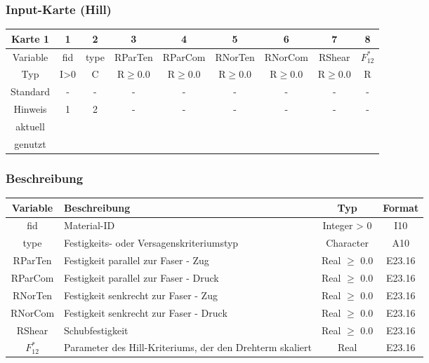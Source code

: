 \documentclass[11pt,titlepage,listof=totoc,bibliography=totoc,twoside]{scrreprt}
\begin{document}
{{\newpage

\subsubsection{Input-Karte (Hill)}

\begin{table}[htbp]
\centering
\begin{tabularx}{\textwidth}{cCCCCCCCC}
\toprule
Karte 1	& 1		& 2		& 3		& 4		& 5		& 6		& 7		& 8		\\
\midrule
Variable& fid		& type		& RParTen	& RParCom	& RNorTen	& RNorCom	& RShear	& $F_{12}^*$	\\
Typ	& I>0		& C		& R$\ge$0.0	& R$\ge$0.0	& R$\ge$0.0	& R$\ge$0.0	& R$\ge$0.0	& R		\\
Standard& -		& -		& -		& -		& -		& -		& -		& -		\\
Hinweis	& 1		& 2		& -		& -		& -		& -		& -		& -		\\
aktuell	& 	& 	& 	& 	& 	& 	& 	& 	\\
genutzt \\
\bottomrule
\end{tabularx}
\end{table}

\subsubsection{Beschreibung}

\begin{tabularx}{\textwidth}{cXcc}
\toprule
Variable& Beschreibung														& Typ			& Format\\
\midrule
fid	& Material-ID														& Integer > 0		& I10	\\
type	& Festigkeits- oder Versagenskriteriumstyp										& Character		& A10	\\
RParTen	& Festigkeit parallel zur Faser - Zug											& Real $\ge$ 0.0	& E23.16\\
RParCom	& Festigkeit parallel zur Faser - Druck											& Real $\ge$ 0.0	& E23.16\\
RNorTen	& Festigkeit senkrecht zur Faser - Zug											& Real $\ge$ 0.0	& E23.16\\
RNorCom	& Festigkeit senkrecht zur Faser - Druck										& Real $\ge$ 0.0	& E23.16\\
RShear	& Schubfestigkeit 													& Real $\ge$ 0.0	& E23.16\\
$F_{12}^*$	& Parameter des Hill-Kriteriums, der den Drehterm skaliert							& Real 			& E23.16\\
\bottomrule
\end{tabularx}

}}
\end{document}
